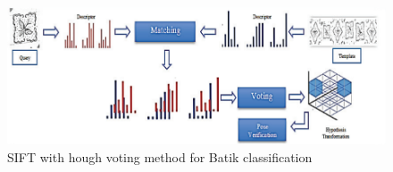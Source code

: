\documentclass[10pt]{beamer}
\begin{document}
\begin{frame}{\cite{nurhaida2015automatic}}
	
	\begin{figure}
		\centering
		\includegraphics[width=1.0\linewidth]{sift-hough-voting-method}
		\caption{SIFT with hough voting method for Batik classification}
		\label{fig_sift_hough_voting_method}
    \end{figure}

\end{frame}
\end{document}
